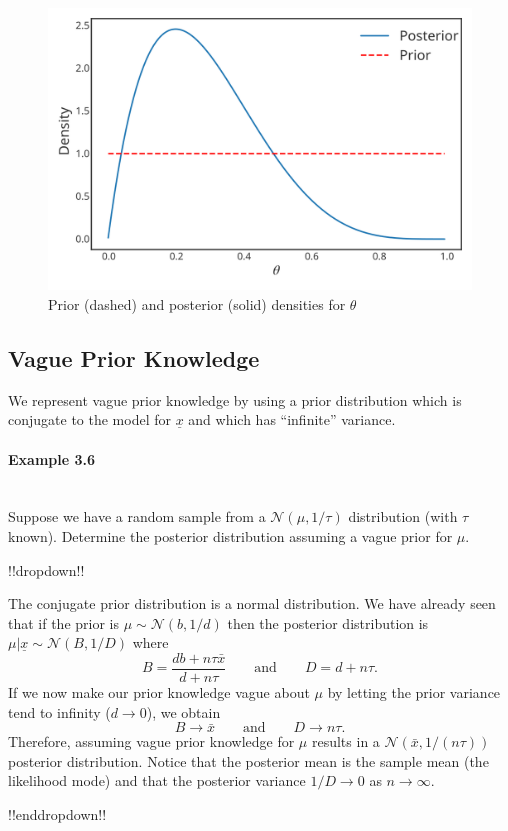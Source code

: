 \begin{figure}[ht]

\includegraphics{images/priorplot1.svg}
\caption{Prior (dashed) and posterior (solid) densities for $\theta$}
\label{fig:little}

\end{figure}

 
\subsection*{Vague Prior Knowledge}
We represent vague prior knowledge by using a prior distribution which is conjugate to the model for $\underline{x}$ and which has ``infinite'' variance.

\paragraph{Example 3.6}{~\\
Suppose we have a random sample from a $\mathcal{N}(\mu,1/\tau)$ distribution (with $\tau$ known). Determine the posterior distribution assuming a vague prior for $\mu$.

!!dropdown!!

The conjugate prior distribution is a normal distribution. We have already seen that if the prior is $\mu\sim \mathcal{N}(b,1/d)$ then the posterior distribution is $\mu|\underline{x}\sim \mathcal{N}(B,1/D)$ where
            \begin{equation*}
                B=\frac{db+n\tau\bar x}{d+n\tau}\qquad\text{and}\qquad
                D=d+n\tau.
            \end{equation*}
        If we now make our prior knowledge vague about $\mu$ by letting the prior variance tend to infinity ($d\to 0$), we obtain
        $$
        B\to\bar x\qquad\text{and}\qquad D\to n\tau.
        $$
        Therefore, assuming vague prior knowledge for $\mu$ results in a $\mathcal{N}(\bar x,1/(n\tau))$ posterior distribution.  Notice that the posterior mean is the sample mean (the likelihood mode) and that the posterior variance $1/D\to 0$ as $n\to\infty$.

!!enddropdown!!}



